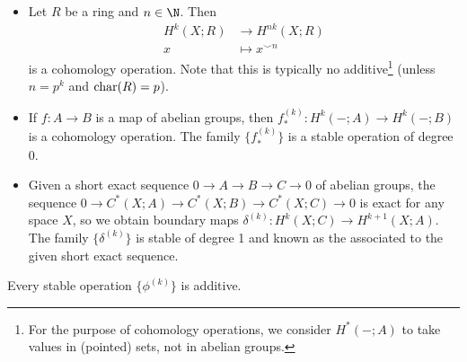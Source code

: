 \begin{example}
	\leavevmode
	\begin{itemize}
		\item Let $R$ be a ring and $n \in \N$.
			Then
			\begin{align*}
				H^k(X; R) &\to H^{n k}(X; R) \\
				x &\mapsto x^{\smile n}
			\end{align*}
			is a cohomology operation.
			Note that this is typically no additive\footnote{For the purpose of cohomology operations, we consider $H^*({{-}}; A)$ to take values in (pointed) sets, not in abelian groups.} (unless $n = p^k$ and $\operatorname{char}(R) = p$).
		\item If $f\colon A \to B$ is a map of abelian groups, then $f_*^{(k)}\colon H^k({{-}}; A) \to H^k({{-}}; B)$ is a cohomology operation.
			The family $\{f_*^{(k)}\}$ is a stable operation of degree 0.
		\item Given a short exact sequence $0 \to A \to B \to C \to 0$ of abelian groups, the sequence $0 \to C^*(X; A) \to C^*(X; B) \to C^*(X; C) \to 0$ is exact for any space $X$, so we obtain boundary maps $\delta^{(k)}\colon H^k(X; C) \to H^{k + 1}(X; A)$.
			The family $\{\delta^{(k)}\}$ is stable of degree 1 and known as the  associated to the given short exact sequence.
	\end{itemize}
\end{example}
\begin{lemma}
	Every stable operation $\{\phi^{(k)}\}$ is additive.
\end{lemma}

